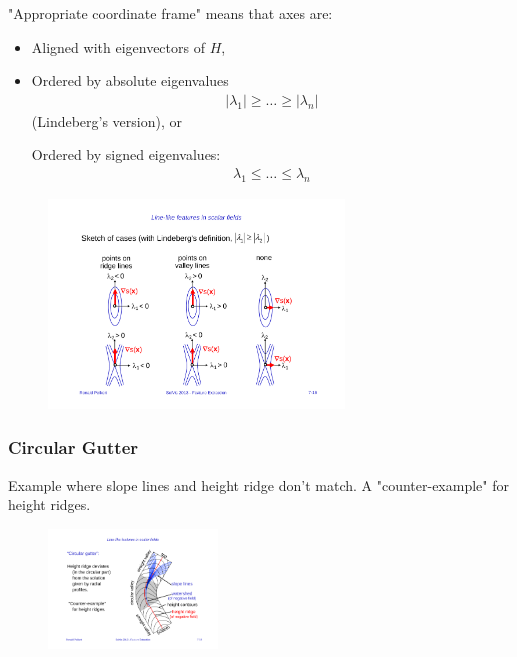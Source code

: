"Appropriate coordinate frame" means that axes are:
\begin{itemize}
 \item Aligned with eigenvectors of $H$,
 \item Ordered by absolute eigenvalues
     \begin{align*}
         |\lambda_1| \geq \ldots \geq |\lambda_n|      \end{align*}
         (Lindeberg's version), or

     Ordered  by signed eigenvalues: 
     \begin{align*}
         \lambda_1 \leq \ldots \leq \lambda_n
     \end{align*}
\end{itemize}


\begin{figure}[H]
    \centering
    \includegraphics[width=0.7\textwidth]{img/07_lindeberg_cases}
\end{figure}

\subsubsection{Circular Gutter}
Example where slope lines and height ridge don't match. A "counter-example" for height ridges.
\begin{figure}[H]
    \centering
    \includegraphics[width=0.4\textwidth]{img/07_gutter_example}
\end{figure}

